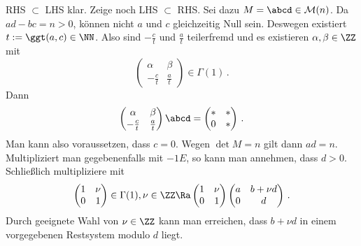 \begin{bewe}
RHS $\subset$ LHS klar. Zeige noch LHS $\subset$ RHS. Sei dazu $M = \abcd \in \mathcal M (n)$. Da $ad-bc = n > 0$, können nicht $a$ und $c$ gleichzeitig Null sein. Deswegen existiert $t := \ggt (a,c) \in \NN$. Also sind $-\frac ct$ und $\frac at$ teilerfremd und es existieren $\alpha, \beta \in \ZZ$ mit
\[
\begin{pmatrix}
\alpha & \beta\\
-\frac ct & \frac at
\end{pmatrix} \in \Gamma (1)
\,.
\]
Dann
\[
\begin{pmatrix}
\alpha & \beta\\
-\frac ct & \frac at
\end{pmatrix} \abcd
= \begin{pmatrix}
* & *\\ 0 & *
\end{pmatrix}
\,.
\]
Man kann also voraussetzen, dass $c = 0$. Wegen $\det M = n$ gilt dann $ad = n$. Multipliziert man gegebenenfalls mit $-1 E$, so kann man annehmen, dass $d > 0$. Schließlich multipliziere mit 
\[
\begin{pmatrix}
1 & \nu\\
0 & 1
\end{pmatrix} \in \Gamma (1), \nu \in \ZZ \Ra \begin{pmatrix}
1 & \nu\\
0 & 1
\end{pmatrix}
\begin{pmatrix}
a & b + \nu d\\
0 & d
\end{pmatrix}
\,.
\]
Durch geeignete Wahl von $\nu \in \ZZ$ kann man erreichen, dass $b + \nu d$ in einem vorgegebenen Restsystem modulo $d$ liegt.


\end{bewe}
